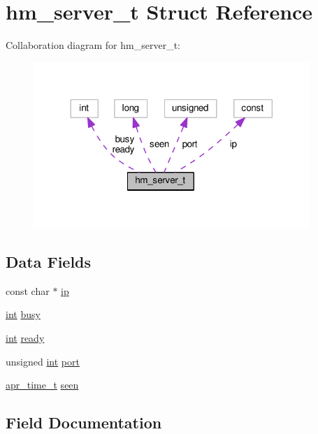 \hypertarget{structhm__server__t}{}\section{hm\+\_\+server\+\_\+t Struct Reference}
\label{structhm__server__t}


Collaboration diagram for hm\+\_\+server\+\_\+t\+:
\nopagebreak
\begin{figure}[H]
\begin{center}
\leavevmode
\includegraphics[width=296pt]{structhm__server__t__coll__graph}
\end{center}
\end{figure}
\subsection*{Data Fields}
\begin{DoxyCompactItemize}
\item 
const char $\ast$ \hyperlink{structhm__server__t_a8493413fcec7fc585224693411b4e770}{ip}
\item 
\hyperlink{pcre_8txt_a42dfa4ff673c82d8efe7144098fbc198}{int} \hyperlink{structhm__server__t_a439a8fec13643f916a245356b8d7c531}{busy}
\item 
\hyperlink{pcre_8txt_a42dfa4ff673c82d8efe7144098fbc198}{int} \hyperlink{structhm__server__t_a35d0e2fb870eaa3a70ea4ae60f165791}{ready}
\item 
unsigned \hyperlink{pcre_8txt_a42dfa4ff673c82d8efe7144098fbc198}{int} \hyperlink{structhm__server__t_a8842acd43edafee0af8ce5e5d450541a}{port}
\item 
\hyperlink{group__apr__time_gadb4bde16055748190eae190c55aa02bb}{apr\+\_\+time\+\_\+t} \hyperlink{structhm__server__t_a6e3c9c14a5b5d651c49f8257acdde620}{seen}
\end{DoxyCompactItemize}


\subsection{Field Documentation}
